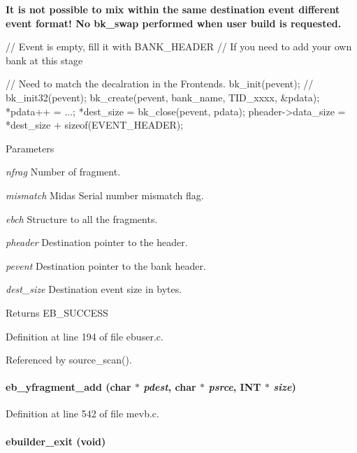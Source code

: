 {\bfseries  It is not possible to mix within the same destination event different event format! No bk\_\-swap performed when user build is requested. }


\begin{DoxyCode}
  // Event is empty, fill it with BANK_HEADER
  // If you need to add your own bank at this stage

  // Need to match the decalration in the Frontends.
  bk_init(pevent);  
//  bk_init32(pevent);
  bk_create(pevent, bank_name, TID_xxxx, &pdata);
  *pdata++ = ...;
  *dest_size = bk_close(pevent, pdata);
  pheader->data_size = *dest_size + sizeof(EVENT_HEADER);
\end{DoxyCode}



\begin{DoxyParams}{Parameters}
\item[{\em nfrag}]Number of fragment. \item[{\em mismatch}]Midas Serial number mismatch flag. \item[{\em ebch}]Structure to all the fragments. \item[{\em pheader}]Destination pointer to the header. \item[{\em pevent}]Destination pointer to the bank header. \item[{\em dest\_\-size}]Destination event size in bytes. \end{DoxyParams}
\begin{DoxyReturn}{Returns}
EB\_\-SUCCESS 
\end{DoxyReturn}


Definition at line 194 of file ebuser.c.

Referenced by source\_\-scan().
\paragraph[{eb\_\-yfragment\_\-add}]{ eb\_\-yfragment\_\-add (char $\ast$ {\em pdest}, \/  char $\ast$ {\em psrce}, \/  {\bf INT} $\ast$ {\em size})}\hfill\label{mevb_8c_a5c203d3d6b404df3d86fdec3f227c8b5}


Definition at line 542 of file mevb.c.
\paragraph[{ebuilder\_\-exit}]{ ebuilder\_\-exit (void)}\hfill\label{mevb_8c_a0e3b6efa306fec216605016a189b169c}


